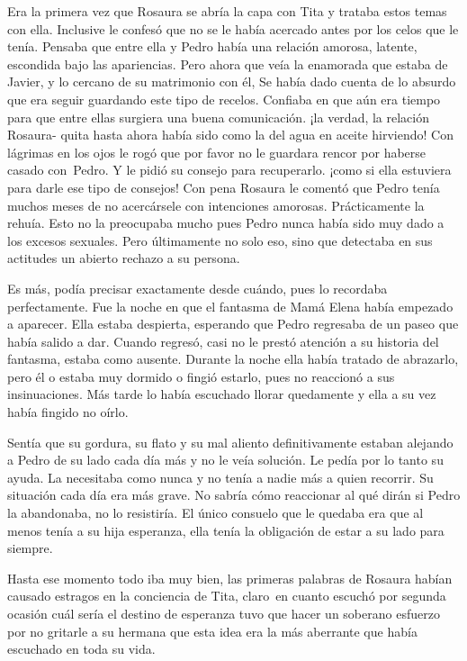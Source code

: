 Era la primera vez que Rosaura se abría la capa con Tita y trataba estos
temas con ella. Inclusive le confesó que no se le había acercado antes
por los celos que le tenía. Pensaba que entre ella y Pedro había una
relación amorosa, latente, escondida bajo las apariencias. Pero ahora
que veía la enamorada que estaba de Javier, y lo cercano de su
matrimonio con él, Se había dado cuenta de lo absurdo que era seguir
guardando este tipo de recelos. Confiaba en que aún era tiempo para que
entre ellas surgiera una buena comunicación. ¡la verdad, la relación
Rosaura- quita hasta ahora había sido como la del agua en aceite
hirviendo! Con lágrimas en los ojos le rogó que por favor no le guardara
rencor por haberse casado con~Pedro. Y le pidió su consejo para
recuperarlo. ¡como si ella estuviera para darle ese tipo de consejos!
Con pena Rosaura le comentó que Pedro tenía muchos meses de no
acercársele con intenciones amorosas. Prácticamente la rehuía. Esto no
la preocupaba mucho pues Pedro nunca había sido muy dado a los excesos
sexuales. Pero últimamente no solo eso, sino que detectaba en sus
actitudes un abierto rechazo a su persona.

Es más, podía precisar exactamente desde cuándo, pues lo recordaba
perfectamente. Fue la noche en que el fantasma de Mamá Elena había
empezado a aparecer. Ella estaba despierta, esperando que Pedro
regresaba de un paseo que había salido a dar. Cuando regresó, casi no le
prestó atención a su historia del fantasma, estaba como ausente. Durante
la noche ella había tratado de abrazarlo, pero él o estaba muy dormido o
fingió estarlo, pues no reaccionó a sus insinuaciones. Más tarde lo
había escuchado llorar quedamente y ella a su vez había fingido no
oírlo.

Sentía que su gordura, su flato y su mal aliento definitivamente
estaban alejando a Pedro de su lado cada día más y no le veía solución.
Le pedía por lo tanto su ayuda. La necesitaba como nunca y no tenía a
nadie más a quien recorrir. Su situación cada día era más grave. No
sabría cómo reaccionar al \glqq{}qué dirán\grqq{} si Pedro la abandonaba, no lo
resistiría. El único consuelo que le quedaba era que al menos tenía a su
hija esperanza, ella tenía la obligación de estar a su lado para
siempre.

Hasta ese momento todo iba muy bien, las primeras palabras de Rosaura
habían causado estragos en la conciencia de Tita, claro~en cuanto
escuchó por segunda ocasión cuál sería el destino de esperanza tuvo que
hacer un soberano esfuerzo por no gritarle a su hermana que esta idea
era la más aberrante que había escuchado en toda su vida.

